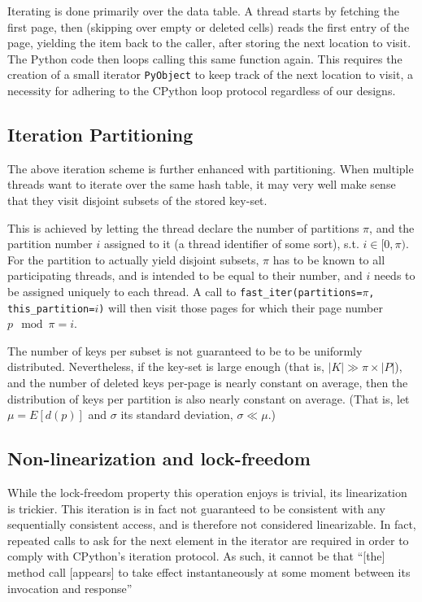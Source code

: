 Iterating is done primarily over the data table.
A thread starts by fetching the first page, then (skipping over empty or deleted cells) reads the first entry of the page, yielding the item back to the caller, after storing the next location to visit.
The Python code then loops calling this same function again.
This requires the creation of a small iterator \texttt{PyObject} to keep track of the next location to visit, a necessity for adhering to the CPython loop protocol regardless of our designs.

\subsection{Iteration Partitioning}\label{subsec:iteration-partitioning}

The above iteration scheme is further enhanced with partitioning.
When multiple threads want to iterate over the same hash table, it may very well make sense that they visit disjoint subsets of the stored key-set.

This is achieved by letting the thread declare the number of partitions $\pi$, and the partition number $i$ assigned to it (a thread identifier of some sort), s.t. $i \in [0, \pi)$.
For the partition to actually yield disjoint subsets, $\pi$ has to be known to all participating threads, and is intended to be equal to their number, and $i$ needs to be assigned uniquely to each thread.
A call to \texttt{{fast\_iter(partitions=$\pi$, this\_partition=$i$)}} will then visit those pages for which their page number $p \mod \pi = i$.

The number of keys per subset is not guaranteed to be to be uniformly distributed.
Nevertheless, if the key-set is large enough (that is, $|K| \gg \pi \times |P|$), and the number of deleted keys per-page is nearly constant on average, then the distribution of keys per partition is also nearly constant on average.
(That is, let $\mu = E[d(p)]$ and $\sigma$ its standard deviation, $\sigma \ll \mu$.)

\subsection{Non-linearization and lock-freedom}\label{subsec:iteration-linearization-lock-freedom}
While the lock-freedom property this operation enjoys is trivial, its linearization is trickier.
This iteration is in fact not guaranteed to be consistent with any sequentially consistent access, and is therefore not considered linearizable.
In fact, repeated calls to ask for the next element in the iterator are required in order to comply with CPython's iteration protocol.
As such, it cannot be that ``[the] method call [appears] to take effect instantaneously at some moment between its invocation and response''~\cite[Principle~3.5.1]{art-mp}

